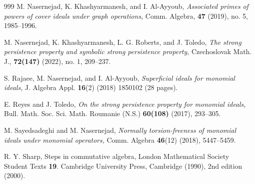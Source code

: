 \documentclass[11pt]{amsart}
\begin{document}
\begin{thebibliography}{999}
    M. Nasernejad,  K. Khashyarmanesh, and  I. Al-Ayyoub, {\it Associated primes of powers  of cover ideals under graph operations,} Comm. 
Algebra, {\bf 47} (2019), no. 5, 1985--1996. 

   M. Nasernejad,  K. Khashyarmanesh, L. G. Roberts, and J. Toledo, {\it The strong persistence property and symbolic strong persistence property,} {Czechoslovak Math. J.}, {\bf  72(147)}  (2022), no. 1, 209--237. 


  S. Rajaee, M. Nasernejad, and  I. Al-Ayyoub, {\it Superficial ideals for monomial ideals,} J. Algebra Appl. {\bf 16}(2)  (2018) 1850102 (28 pages).

    E. Reyes  and J. Toledo, {\it On the strong persistence property for monomial ideals,}  Bull. Math. Soc. Sci. Math. Roumanie (N.S.) 
{\bf 60(108)} (2017),  293--305. 

   M. Sayedsadeghi and M. Nasernejad, \textit{ Normally torsion-freeness of monomial ideals under monomial operators,}  Comm. Algebra {\bf 46}(12) (2018),  5447--5459.

   R. Y. Sharp, { Steps in commutative algebra,}  London Mathematical Society Student Texts  {\bf 19}. Cambridge University Press, Cambridge (1990), 2nd edition (2000).


 \end{thebibliography}
 



\end{document}
